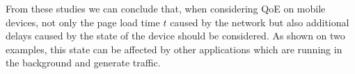 From these studies we can conclude that, when considering \gls{QoE} on mobile devices, not only the page load time \(t\) caused by the network but also additional delays caused by the state of the device should be considered.
As shown on two examples, this state can be affected by other applications which are running in the background and generate traffic.


